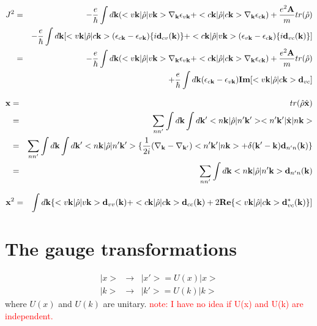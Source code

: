 \documentclass[aps,prb,preprint]{revtex4-1}
\begin{document}
\begin{appendix}
\begin{eqnarray}
J^{2} &=&  -\frac{e}{\hbar} \int d{\bf k} (<v{\bf k}|\hat{\rho}|v{\bf k}> \nabla_{\bf k} \epsilon_{v{\bf k}} +<c{\bf k}|\hat{\rho}|c{\bf k}> \nabla_{\bf k} \epsilon_{c{\bf k}} ) + \frac{e^2{\bf A}}{m}tr(\hat{\rho}) \nonumber \\
&& -\frac{e}{\hbar} \int d{\bf k} [ <v{\bf k}|\hat{\rho}|c{\bf k}> (\epsilon_{c{\bf k}}-\epsilon_{v{\bf k}}) \{i {\bf d}_{cv}({\bf k})\} + <c{\bf k}|\hat{\rho}|v{\bf k}> (\epsilon_{v{\bf k}}-\epsilon_{c{\bf k}}) \{i {\bf d}_{vc}({\bf k})\} ]  \nonumber \\
&=&  -\frac{e}{\hbar} \int d{\bf k} (<v{\bf k}|\hat{\rho}|v{\bf k}> \nabla_{\bf k} \epsilon_{v{\bf k}} +<c{\bf k}|\hat{\rho}|c{\bf k}> \nabla_{\bf k} \epsilon_{c{\bf k}} ) + \frac{e^2{\bf A}}{m}tr(\hat{\rho}) \nonumber \\
&& + \frac{e}{\hbar} \int d{\bf k} (\epsilon_{c{\bf k}}-\epsilon_{v{\bf k}}) {\bf Im}[ <v{\bf k}|\hat{\rho}|c{\bf k}>{\bf d}_{vc} ]  
\end{eqnarray} 

\begin{eqnarray}
{\bf x} &=&  tr(\hat{\rho}\hat{\bf x}) \nonumber \\
&=&  \sum_{nn'} \int d{\bf k} \int d{\bf k'} <n{\bf k}|\hat{\rho}|n'{\bf k'}><n'{\bf k'}|\hat{\bf x}|n{\bf k}> \nonumber \\
&=&  \sum_{nn'} \int d{\bf k} \int d{\bf k'} <n{\bf k}|\hat{\rho}|n'{\bf k'}>\{ \frac{1}{2i}(\nabla_{\bf k}-\nabla_{\bf k'}) <n'{\bf k'}|n{\bf k}> + \delta({\bf k'-k}) {\bf d}_{n'n}({\bf k})\} \nonumber \\
&=& \sum_{nn'} \int d{\bf k} <n{\bf k}|\hat{\rho}|n'{\bf k}> {\bf d}_{n'n}({\bf k})
\end{eqnarray} 

\begin{eqnarray}
{\bf x}^2 &=& \int d{\bf k} \{<v{\bf k}|\hat{\rho}|v{\bf k}> {\bf d}_{vv}({\bf k}) + <c{\bf k}|\hat{\rho}|c{\bf k}> {\bf d}_{cc}({\bf k}) + 2{\bf Re} \{ <v{\bf k}|\hat{\rho}|c{\bf k}> {\bf d}_{vc}^*({\bf k}) \}]
\end{eqnarray} 

\newpage

\section{The gauge transformations}
\begin{eqnarray}
|x> &\rightarrow& |x'> = U(x) |x> \\
|k> &\rightarrow& |k'> = U(k) |k>
\end{eqnarray} 
where $U(x)$ and $U(k)$ are unitary.
\textcolor{red}{note: I have no idea if U(x) and U(k) are independent. }


\end{appendix}
\end{document}
